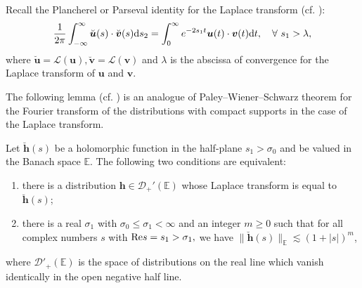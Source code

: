\documentclass[final,leqno]{siamltex}
\begin{document}
Recall the Plancherel or Parseval identity for the Laplace transform (cf.
\cite[(2.46)]{Cohen2007}):
 \begin{equation}\label{PI}
 \frac{1}{2 \pi} \int_{- \infty}^{\infty} \breve {\boldsymbol  u} (s)\cdot
\breve{\boldsymbol   v} (s) {\rm d} s_2= \int_0^{\infty} e^{- 2 s_1 t}
  {\boldsymbol u} (t)\cdot{\boldsymbol v} (t) {\rm d} t,\quad\forall ~
s_1>\lambda,
 \end{equation}
where $\breve  {\boldsymbol u}= \mathscr L (\boldsymbol u), \breve {\boldsymbol
v}= \mathscr L (\boldsymbol v)$ and $\lambda$ is the abscissa of convergence for
the Laplace transform of $\boldsymbol u$ and $\boldsymbol v$.

The following lemma (cf. \cite[Theorem 43.1]{Treves1975}) is an analogue of
Paley--Wiener--Schwarz theorem for the Fourier transform of the distributions
with compact supports in the case of the Laplace transform.

\begin{lemma}\label {A2}
Let $\breve {\boldsymbol h} (s)$ be a holomorphic function in the half-plane
$s_1 > \sigma_0$ and be valued in the Banach space $\mathbb E$. The following
two conditions are equivalent:
\begin{enumerate}

\item there is a distribution $\boldsymbol h \in \mathcal D_{+}'(\mathbb E)$
whose Laplace transform is equal to $\breve{\boldsymbol h}(s)$;

\item there is a real $\sigma_1$ with $\sigma_0 \leq \sigma_1 <\infty$ and an
integer $m \geq 0$ such that for all complex numbers $s$ with ${\rm Re} s =s_1 >
\sigma_1,$ we have $\| \breve {\boldsymbol  h} (s)\|_{\mathbb E} \lesssim
(1+|s|)^{m}$,

\end{enumerate}
where $\mathcal D'_{+}(\mathbb E)$ is the space of distributions on the real
line which vanish identically in the open negative half line.
\end{lemma}
\end{document}
